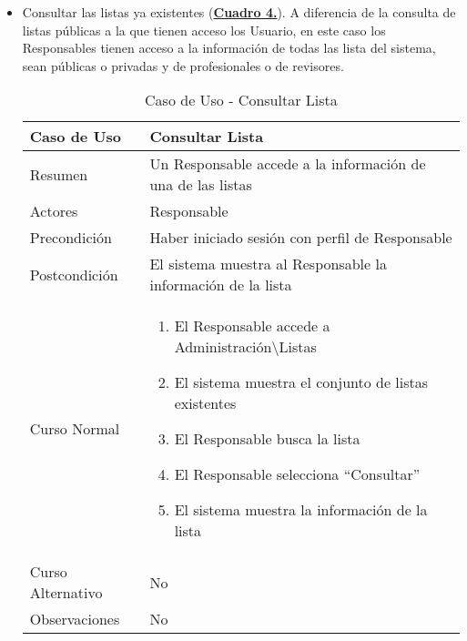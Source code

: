 \begin{itemize}
  \newpage~
	\item \addtocounter{tabla}{1} Consultar las listas ya existentes (\textbf{\hyperref[tab:curConsultarLista]{Cuadro 4.}}). A diferencia de la consulta de listas públicas a la que tienen acceso los Usuario, en este caso los Responsables tienen acceso a la información de todas las lista del sistema, sean públicas o privadas y de profesionales o de revisores.
		\begin{table}[!htbp]
		  \centering  \addtocounter{casouso}{1}
		  \begin{tabular}{|l | p{100mm}|}
		    \textbf{Caso de Uso}  & \textbf{Consultar Lista} \\ \hline
		    Resumen 		 & Un Responsable accede a la información de una de las listas \\ \hline
		    Actores  		 & Responsable \\ \hline
		    Precondición  	 & Haber iniciado sesión con perfil de Responsable \\ \hline
		    Postcondición  	 & El sistema muestra al Responsable la información de la lista \\ \hline
		    Curso Normal   	 & \begin{enumerate}
			  \item El Responsable accede a Administración\textbackslash Listas
			  \item El sistema muestra el conjunto de listas existentes
			  \item El Responsable busca la lista
			  \item El Responsable selecciona ``Consultar''
			  \item El sistema muestra la información de la lista
		    \end{enumerate}  \\ \hline
		    Curso Alternativo  & No  \\ \hline
		    Observaciones 	 & No \\ \hline
		  \end{tabular}
		  \caption{Caso de Uso  - Consultar Lista}
		  \label{tab:curConsultarLista}
		\end{table}
		\FloatBarrier 
  

\end{itemize}

